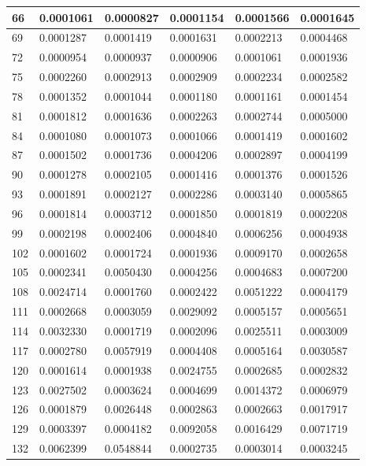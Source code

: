\documentclass{article}
\begin{document}
\begin{table}[H]
\begin{tabular}{|l|l|l|l|l|l|}
66 & 0.0001061 & 0.0000827 & 0.0001154 & 0.0001566 & 0.0001645 \\ \hline
69 & 0.0001287 & 0.0001419 & 0.0001631 & 0.0002213 & 0.0004468 \\ \hline
72 & 0.0000954 & 0.0000937 & 0.0000906 & 0.0001061 & 0.0001936 \\ \hline
75 & 0.0002260 & 0.0002913 & 0.0002909 & 0.0002234 & 0.0002582 \\ \hline
78 & 0.0001352 & 0.0001044 & 0.0001180 & 0.0001161 & 0.0001454 \\ \hline
81 & 0.0001812 & 0.0001636 & 0.0002263 & 0.0002744 & 0.0005000 \\ \hline
84 & 0.0001080 & 0.0001073 & 0.0001066 & 0.0001419 & 0.0001602 \\ \hline
87 & 0.0001502 & 0.0001736 & 0.0004206 & 0.0002897 & 0.0004199 \\ \hline
90 & 0.0001278 & 0.0002105 & 0.0001416 & 0.0001376 & 0.0001526 \\ \hline
93 & 0.0001891 & 0.0002127 & 0.0002286 & 0.0003140 & 0.0005865 \\ \hline
96 & 0.0001814 & 0.0003712 & 0.0001850 & 0.0001819 & 0.0002208 \\ \hline
99 & 0.0002198 & 0.0002406 & 0.0004840 & 0.0006256 & 0.0004938 \\ \hline
102 & 0.0001602 & 0.0001724 & 0.0001936 & 0.0009170 & 0.0002658 \\ \hline
105 & 0.0002341 & 0.0050430 & 0.0004256 & 0.0004683 & 0.0007200 \\ \hline
108 & 0.0024714 & 0.0001760 & 0.0002422 & 0.0051222 & 0.0004179 \\ \hline
111 & 0.0002668 & 0.0003059 & 0.0029092 & 0.0005157 & 0.0005651 \\ \hline
114 & 0.0032330 & 0.0001719 & 0.0002096 & 0.0025511 & 0.0003009 \\ \hline
117 & 0.0002780 & 0.0057919 & 0.0004408 & 0.0005164 & 0.0030587 \\ \hline
120 & 0.0001614 & 0.0001938 & 0.0024755 & 0.0002685 & 0.0002832 \\ \hline
123 & 0.0027502 & 0.0003624 & 0.0004699 & 0.0014372 & 0.0006979 \\ \hline
126 & 0.0001879 & 0.0026448 & 0.0002863 & 0.0002663 & 0.0017917 \\ \hline
129 & 0.0003397 & 0.0004182 & 0.0092058 & 0.0016429 & 0.0071719 \\ \hline
132 & 0.0062399 & 0.0548844 & 0.0002735 & 0.0003014 & 0.0003245 \\ \hline

\end{tabular}
\end{table}
\end{document}
